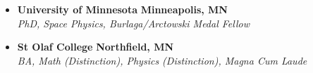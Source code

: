 
\begin{itemize}[leftmargin=\parindent]
        \parskip=0.1em

    \item[]
        \headerrow
        {\textbf{University of Minnesota}}
        {\textbf{Minneapolis, MN}}
        \\
        \headerrow
        {\emph{PhD, Space Physics, Burlaga/Arctowski Medal Fellow}}
        {\emph{}}

    \item[]
        \headerrow
        {\textbf{St Olaf College}}
        {\textbf{Northfield, MN}}
        \\
        \headerrow
        {\emph{BA, Math (Distinction), Physics (Distinction), Magna Cum Laude}}
        {\emph{}}
\end{itemize}
